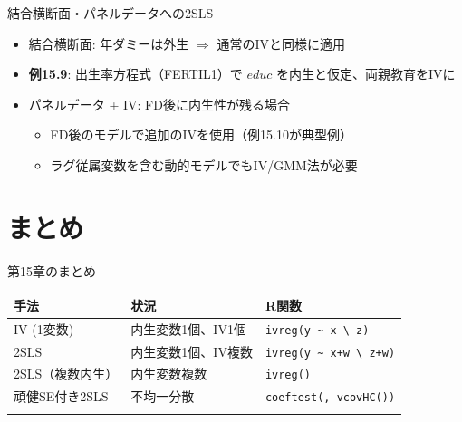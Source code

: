 \documentclass[
  ignorenonframetext,
]{beamer}
\providecommand{\tightlist}{%
  \setlength{\itemsep}{0pt}\setlength{\parskip}{0pt}}
\begin{document}
\begin{frame}{結合横断面・パネルデータへの2SLS}
\label{ux7d50ux5408ux6a2aux65adux9762ux30d1ux30cdux30ebux30c7ux30fcux30bfux3078ux306e2sls}
\begin{itemize}
\tightlist
\item
  結合横断面: 年ダミーは外生 \(\Rightarrow\) 通常のIVと同様に適用
\item
  \textbf{例15.9}: 出生率方程式（FERTIL1）で \(educ\)
  を内生と仮定、両親教育をIVに
\item
  パネルデータ + IV: FD後に内生性が残る場合

  \begin{itemize}
  \tightlist
  \item
    FD後のモデルで追加のIVを使用（例15.10が典型例）
  \item
    ラグ従属変数を含む動的モデルでもIV/GMM法が必要
  \end{itemize}
\end{itemize}
\end{frame}

\section{まとめ}\label{ux307eux3068ux3081}

\begin{frame}[fragile]{第15章のまとめ}
\label{ux7b2c15ux7ae0ux306eux307eux3068ux3081}
\footnotesize

\begin{longtable}[]{@{}lll@{}}
\toprule\noalign{}
手法 & 状況 & R関数 \\
\midrule\noalign{}
\endhead
IV (1変数) & 内生変数1個、IV1個 &
\texttt{ivreg(y\ \textasciitilde{}\ x\ \textbackslash{}\textbar{}\ z)} \\
2SLS & 内生変数1個、IV複数 &
\texttt{ivreg(y\ \textasciitilde{}\ x+w\ \textbackslash{}\textbar{}\ z+w)} \\
2SLS（複数内生） & 内生変数複数 & \texttt{ivreg()} \\
頑健SE付き2SLS & 不均一分散 & \texttt{coeftest(,\ vcovHC())} \\
\bottomrule\noalign{}
\end{longtable}

\normalsize
\end{frame}
\end{document}
